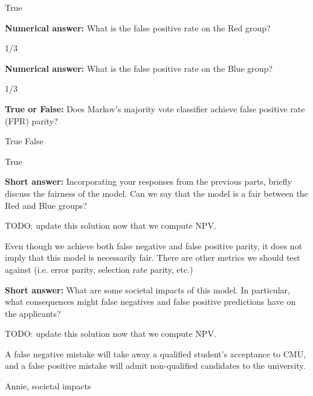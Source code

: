 \begin{parts}
\begin{subparts}
    \begin{soln}
        True
    \end{soln}

    \subpart[1] \textbf{Numerical answer:} What is the false positive rate on the Red group?

    \begin{tcolorbox}[fit,height=1cm, width=2cm, blank, borderline={1pt}{-2pt}]
    \end{tcolorbox}
    \begin{soln}
    1/3
    \end{soln}

    \subpart[1] \textbf{Numerical answer:} What is the false positive rate on the Blue group?
    \begin{tcolorbox}[fit,height=1cm, width=2cm, blank, borderline={1pt}{-2pt}]
    \end{tcolorbox}
    \begin{soln}
    1/3
    \end{soln}

    \subpart[1] \textbf{True or False:} Does Markov's majority vote classifier achieve false positive rate (FPR) parity?
    \begin{checkboxes}
     \choice True 
     \choice False
    \end{checkboxes}

    \begin{soln}
        True
    \end{soln}

    \subpart[2] \textbf{Short answer:} Incorporating your responses from the previous parts, briefly discuss the fairness of the model. Can we say that the model is a fair between the Red and Blue groups?
    \fillwithlines{12em}
    \begin{soln}
    TODO: update this solution now that we compute NPV.
    
        Even though we achieve both false negative and false positive parity, it does not imply that this model is necessarily fair. There are other metrics we should test against (i.e. error parity, selection rate parity, etc.)
    \end{soln}

\clearpage
    \subpart[1] \textbf{Short answer:} What are some societal impacts of this model. In particular, what consequences might false negatives and false positive predictions have on the applicants?
    \fillwithlines{12em}
    \begin{soln}
    TODO: update this solution now that we compute NPV.
    
        A false negative mistake will take away a qualified student's acceptance to CMU, and a false positive mistake will admit non-qualified candidates to the university.
    \end{soln}
    
\end{subparts}

\begin{qauthor}
    Annie, societal impacts
\end{qauthor}



\end{parts}